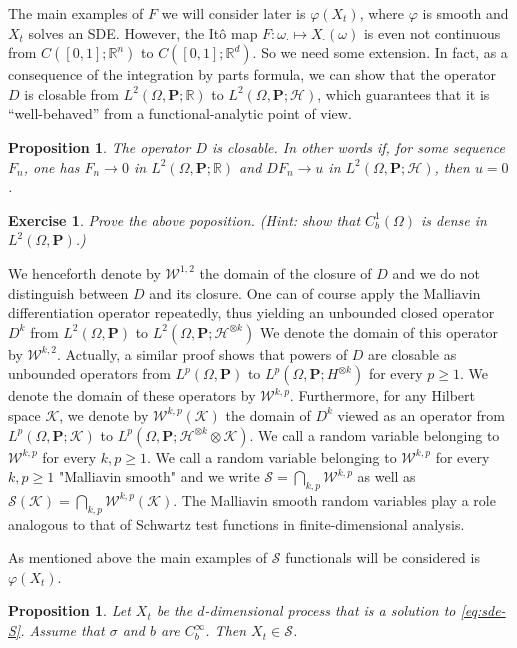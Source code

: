 \documentclass[twoside, 12pt]{book}
\numberwithin{equation}{chapter}
\newtheorem{proposition}[theorem]{Proposition}
\newtheorem{exercise}{Exercise}[section]
\def\cH{{\mathcal H}}
\def\cK{{\mathcal K}}
\def\mR{{\mathbb R}}
\def\bP{{\mathbf P}}
\def\sS{{\mathscr S}}
\def\sW{{\mathscr W}}
\def\geq{\geqslant}
\begin{document}
    \medspace 
    
    The main examples of $F$ we will consider later is $\varphi(X_t)$, where $\varphi$ is smooth and $X_t$ solves an SDE. However, the It\^o map $F: \omega_{\cdot}\mapsto X_{\cdot}(\omega)$ is even not continuous from $C([0,1];\mR^n)$ to $C([0,1];\mR^d)$. So we need some extension. In fact, as a consequence of the integration by parts formula, we can show that the operator $D$ is closable  from $L^2(\Omega,\bP;\mR)$ to $L^2(\Omega,\bP;\cH)$, which guarantees that it is “well-behaved” from a functional-analytic point of view.
    
    \begin{proposition}
    	The operator $D$ is closable. In other words if, for some sequence $F_n$, one has $F_n\to 0$ in $L^2(\Omega, \bP;\mR)$ and $DF_n\to u$ in $L^2(\Omega, \bP;\cH)$, then $u=0$.
    \end{proposition}
    \begin{exercise}
    	Prove the above poposition. (Hint: show that $C_b^1(\Omega)$ is dense in $L^2(\Omega,\bP)$.)
    \end{exercise}
    
    We henceforth denote by $\sW^{1,2}$ the domain of the closure of $D$ and we do not distinguish between $D$ and its closure. One can of course apply the Malliavin differentiation operator repeatedly, thus yielding an unbounded closed operator $D^k$ from $L^2(\Omega,\bP)$ to $L^2(\Omega, \bP; \cH^{\otimes k})$ We denote the domain of this operator by $\sW^{k,2}$. Actually, a similar proof shows that powers of $D$ are closable as unbounded operators from $L^p(\Omega, \mathbf{P})$ to $L^p\left(\Omega, \mathbf{P}; H^{\otimes k}\right)$ for every $p \geq 1$. We denote the domain of these operators by $\mathscr{W}^{k, p}$. Furthermore, for any Hilbert space $\cK$, we denote by $\mathscr{W}^{k, p}(\cK)$ the domain of $D^k$ viewed as an operator from $L^p(\Omega, \mathbf{P}; \cK)$ to $L^p\left(\Omega, \mathbf{P}; \cH^{\otimes k} \otimes \cK\right)$. We call a random variable belonging to $\mathscr{W}^{k, p}$ for every $k, p \geq 1$. We call a random variable belonging to $\mathscr{W}^{k, p}$ for every $k, p \geq 1$ "Malliavin smooth" and we write $\sS=\bigcap_{k, p} \mathscr{W}^{k, p}$ as well as $\sS(\cK)=\bigcap_{k, p} \mathscr{W}^{k, p}(\cK)$. The Malliavin smooth random variables play a role analogous to that of Schwartz test functions in finite-dimensional analysis.
    
   As mentioned above the main examples of $\sS$ functionals will be considered is $\varphi(X_t)$.
   \begin{proposition}
   	Let  $X_t$ be the $d$-dimensional process that is a solution to \eqref{eq:sde-S}. Assume that $\sigma$ and $b$ are $C^{\infty}_b$. Then $X_t \in \sS$.   
   \end{proposition}
   
\end{document}
